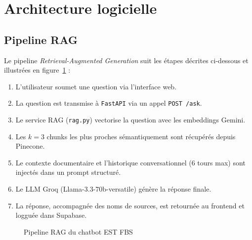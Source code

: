 \documentclass[12pt, a4paper, twoside]{report}
\newcommand{\tech}[1]{\texttt{\color{accent}#1}}
\newcommand{\term}[1]{\textit{\color{primary}#1}}
\newcommand{\file}[1]{\texttt{\footnotesize #1}}
\begin{document}
\section{Architecture logicielle}

\subsection{Pipeline RAG}

Le pipeline \term{Retrieval-Augmented Generation} suit les étapes décrites ci-dessous et illustrées en figure~\ref{fig:pipeline-rag} :

\begin{enumerate}
  \item L'utilisateur soumet une question via l'interface web.
  \item La question est transmise à \tech{FastAPI} via un appel \texttt{POST /ask}.
  \item Le service RAG (\file{rag.py}) vectorise la question avec les embeddings Gemini.
  \item Les $k=3$ chunks les plus proches sémantiquement sont récupérés depuis Pinecone.
  \item Le contexte documentaire et l'historique conversationnel (6 tours max) sont injectés dans un prompt structuré.
  \item Le LLM Groq (Llama-3.3-70b-versatile) génère la réponse finale.
  \item La réponse, accompagnée des noms de sources, est retournée au frontend et logguée dans Supabase.
\end{enumerate}

\begin{figure}[H]
\centering
{}
\caption{Pipeline RAG du chatbot EST FBS}
\label{fig:pipeline-rag}
\end{figure}
\end{document}
